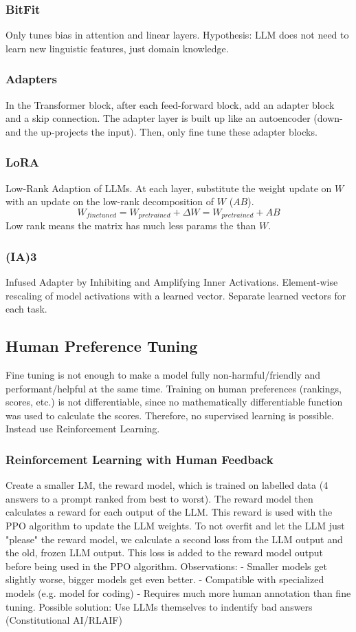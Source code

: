 \documentclass{scrartcl}
\begin{document}
\subsubsection*{BitFit}
Only tunes bias in attention and linear layers.
Hypothesis: LLM does not need to learn new linguistic features, just domain knowledge.

\subsubsection*{Adapters}
In the Transformer block, after each feed-forward block, add an adapter block and a skip connection.
The adapter layer is built up like an autoencoder (down- and the up-projects the input).
Then, only fine tune these adapter blocks.

\subsubsection*{LoRA}
Low-Rank Adaption of LLMs.
At each layer, substitute the weight update on $W$ with an update on the low-rank decomposition of $W$ ($AB$).
$$W_{finetuned} = W_{pretrained} + \Delta W = W_{pretrained} + AB$$
Low rank means the matrix has much less params the than $W$.

\subsubsection*{(IA)3}
Infused Adapter by Inhibiting and Amplifying Inner Activations.
Element-wise rescaling of model activations with a learned vector.
Separate learned vectors for each task.

\subsection*{Human Preference Tuning}
Fine tuning is not enough to make a model fully non-harmful/friendly and performant/helpful at the same time.
Training on human preferences (rankings, scores, etc.) is not differentiable, since no mathematically differentiable function was used to calculate the scores. Therefore, no supervised learning is possible.
Instead use Reinforcement Learning.

\subsubsection*{Reinforcement Learning with Human Feedback}
Create a smaller LM, the reward model, which is trained on labelled data (4 answers to a prompt ranked from best to worst).
The reward model then calculates a reward for each output of the LLM. This reward is used with the PPO algorithm to update the LLM weights.
To not overfit and let the LLM just "please" the reward model, we calculate a second loss from the LLM output and the old, frozen LLM output. This loss is added to the reward model output before being used in the PPO algorithm.
Observations:
- Smaller models get slightly worse, bigger models get even better.
- Compatible with specialized models (e.g. model for coding)
- Requires much more human annotation than fine tuning. Possible solution: Use LLMs themselves to indentify bad answers (Constitutional AI/RLAIF)
\end{document}
